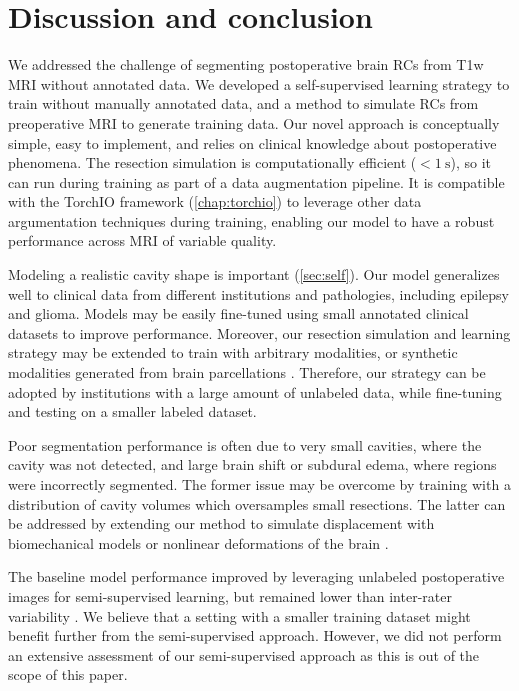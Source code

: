 \section{Discussion and conclusion}
\label{sec:discussion}

We addressed the challenge of segmenting postoperative brain \acp{RC} from \ac{T1w} \ac{MRI} without annotated data.
We developed a self-supervised learning strategy to train without manually annotated data, and a method to simulate \acp{RC} from preoperative \ac{MRI} to generate training data.
Our novel approach is conceptually simple, easy to implement, and relies on clinical knowledge about postoperative phenomena.
The resection simulation is computationally efficient ($< \SI{1}{\second}$), so it can run during training as part of a data augmentation pipeline.
It is compatible with the TorchIO framework \cite{perez-garcia_torchio_2021} (\cref{chap:torchio}) to leverage other data argumentation techniques during training, enabling our model to have a robust performance across \ac{MRI} of variable quality.

Modeling a realistic cavity shape is important (\cref{sec:self}).
Our model generalizes well to clinical data from different institutions and pathologies, including epilepsy and glioma.
Models may be easily fine-tuned using small annotated clinical datasets to improve performance.
Moreover, our resection simulation and learning strategy may be extended to train with arbitrary modalities, or synthetic modalities generated from brain parcellations \cite{billot_learning_2020}.
Therefore, our strategy can be adopted by institutions with a large amount of unlabeled data, while fine-tuning and testing on a smaller labeled dataset.

Poor segmentation performance is often due to very small cavities, where the cavity was not detected, and large brain shift or subdural edema, where regions were incorrectly segmented.
The former issue may be overcome by training with a distribution of cavity volumes which oversamples small resections.
The latter can be addressed by extending our method to simulate displacement with biomechanical models or nonlinear deformations of the brain \cite{granados_generative_2021}.

The baseline model performance improved by leveraging unlabeled postoperative images for semi-supervised learning, but remained lower than inter-rater variability \cite{perez-garcia_simulation_2020}.  %
We believe that a setting with a smaller training dataset might benefit further from the semi-supervised approach.
However, we did not perform an extensive assessment of our semi-supervised approach as this is out of the scope of this paper.

